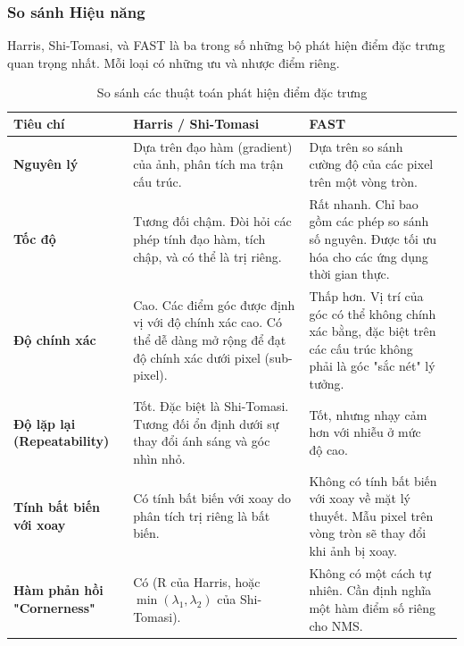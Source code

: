 \subsubsection{So sánh Hiệu năng}
\label{subsubsec:detector_performance_comparison}
Harris, Shi-Tomasi, và FAST là ba trong số những bộ phát hiện điểm đặc trưng quan trọng nhất. Mỗi loại có những ưu và nhược điểm riêng.

\begin{table}[h!]
    \centering
    \caption{So sánh các thuật toán phát hiện điểm đặc trưng}
    \label{tab:detector_comparison}
    \begin{tabular}{|l|p{4cm}|p{4cm}|p{4cm}|}
        \hline
        \textbf{Tiêu chí} & \textbf{Harris / Shi-Tomasi} & \textbf{FAST} \\
        \hline
        \textbf{Nguyên lý} & Dựa trên đạo hàm (gradient) của ảnh, phân tích ma trận cấu trúc. & Dựa trên so sánh cường độ của các pixel trên một vòng tròn. \\
        \hline
        \textbf{Tốc độ} & Tương đối chậm. Đòi hỏi các phép tính đạo hàm, tích chập, và có thể là trị riêng. & Rất nhanh. Chỉ bao gồm các phép so sánh số nguyên. Được tối ưu hóa cho các ứng dụng thời gian thực. \\
        \hline
        \textbf{Độ chính xác} & Cao. Các điểm góc được định vị với độ chính xác cao. Có thể dễ dàng mở rộng để đạt độ chính xác dưới pixel (sub-pixel). & Thấp hơn. Vị trí của góc có thể không chính xác bằng, đặc biệt trên các cấu trúc không phải là góc "sắc nét" lý tưởng. \\
        \hline
        \textbf{Độ lặp lại (Repeatability)} & Tốt. Đặc biệt là Shi-Tomasi. Tương đối ổn định dưới sự thay đổi ánh sáng và góc nhìn nhỏ. & Tốt, nhưng nhạy cảm hơn với nhiễu ở mức độ cao. \\
        \hline
        \textbf{Tính bất biến với xoay} & Có tính bất biến với xoay do phân tích trị riêng là bất biến. & Không có tính bất biến với xoay về mặt lý thuyết. Mẫu pixel trên vòng tròn sẽ thay đổi khi ảnh bị xoay. \\
        \hline
        \textbf{Hàm phản hồi "Cornerness"} & Có (R của Harris, hoặc $\min(\lambda_1, \lambda_2)$ của Shi-Tomasi). & Không có một cách tự nhiên. Cần định nghĩa một hàm điểm số riêng cho NMS. \\
        \hline
    \end{tabular}
\end{table}

